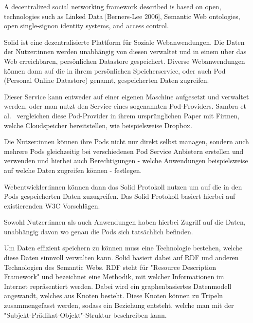 \documentclass[acmtog]{acmart}
\begin{document}


A decentralized social networking framework described is based on open, technologies
such as Linked Data [Berners-Lee 2006], Semantic Web ontologies, open single-signon identity systems, and access control. ~\cite{yeung2023decentralization}

Solid ist eine dezentralisierte Plattform für Soziale Webanwendungen. Die Daten der Nutzer:innen werden unabhängig von diesen verwaltet und in einem über das Web erreichbaren, persönlichen Datastore gespeichert. Diverse Webanwendungen können dann auf die in ihrem persönlichen Speicherservice, oder auch Pod (Personal Online Datastore) genannt, gespeicherten Daten zugreifen.

Dieser Service kann entweder auf einer eigenen Maschine aufgesetzt und verwaltet werden, oder man nutzt den Service eines sogenannten Pod-Providers. Sambra et al.~\cite{sambra2016solid} vergleichen diese Pod-Provider in ihrem ursprünglichen Paper mit Firmen, welche Cloudspeicher bereitstellen, wie beispielsweise Dropbox.

Die Nutzer:innen können ihre Pods nicht nur direkt selbst managen, sondern auch mehrere Pods gleichzeitig bei verschiedenen Pod Service Anbietern erstellen und verwenden und hierbei auch Berechtigungen - welche Anwendungen beispielsweise auf welche Daten zugreifen können - festlegen.

Webentwickler:innen können dann das Solid Protokoll nutzen um auf die in den Pods gespeicherten Daten zuzugreifen. Das Solid Protokoll basiert hierbei auf existierenden W3C Vorschlägen.

Sowohl Nutzer:innen als auch Anwendungen haben hierbei Zugriff auf die Daten, unabhängig davon wo genau die Pods sich tatsächlich befinden.~\cite{sambra2016solid}

Um Daten effizient speichern zu können muss eine Technologie bestehen, welche diese Daten sinnvoll verwalten kann. Solid basiert dabei auf RDF und anderen Technologien des Semantic Webs. RDF steht für "Resource Description Framework" und bezeichnet eine Methodik, mit welcher Informationen im Internet repräsentiert werden. Dabei wird ein graphenbasiertes Datenmodell angewandt, welches aus Knoten besteht. Diese Knoten können zu Tripeln zusammengefasst werden, sodass ein Beziehung entsteht, welche man mit der "Subjekt-Prädikat-Objekt"-Struktur beschreiben kann.~\cite{Wood:14:RCA, Bizer2009LinkedD} 
\end{document}
